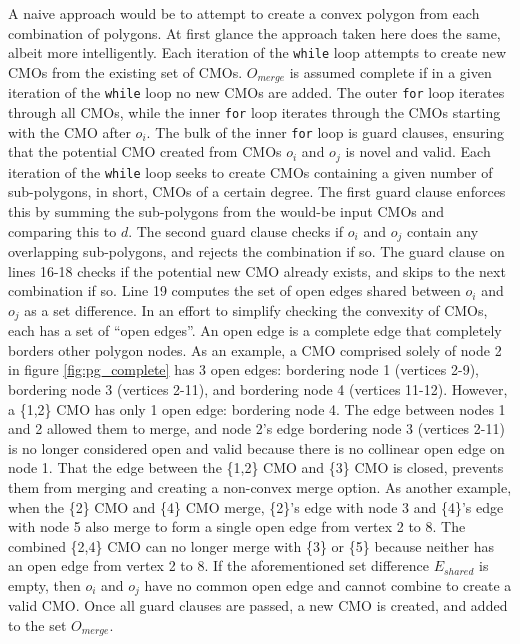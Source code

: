 A naive approach would be to attempt to create a convex polygon from each combination of polygons.
At first glance the approach taken here does the same, albeit more intelligently.
Each iteration of the \verb|while| loop attempts to create new CMOs from the existing set of CMOs.
$O_{merge}$ is assumed complete if in a given iteration of the \verb|while| loop no new CMOs are added.
The outer \verb|for| loop iterates through all CMOs, while the inner \verb|for| loop iterates through the CMOs starting with the CMO after $o_i$.
The bulk of the inner \verb|for| loop is guard clauses, ensuring that the potential CMO created from CMOs $o_i$ and $o_j$ is novel and valid.
Each iteration of the \verb|while| loop seeks to create CMOs containing a given number of sub-polygons, in short, CMOs of a certain degree.
The first guard clause enforces this by summing the sub-polygons from the would-be input CMOs and comparing this to $d$.
The second guard clause checks if $o_i$ and $o_j$ contain any overlapping sub-polygons, and rejects the combination if so.
The guard clause on lines 16-18 checks if the potential new CMO already exists, and skips to the next combination if so.
Line 19 computes the set of open edges shared between $o_i$ and $o_j$ as a set difference.
In an effort to simplify checking the convexity of CMOs, each has a set of ``open edges''.
An open edge is a complete edge that completely borders other polygon nodes.
As an example, a CMO comprised solely of node 2 in figure \ref{fig:pg_complete} has 3 open edges: bordering node 1 (vertices 2-9), bordering node 3 (vertices 2-11), and bordering node 4 (vertices 11-12).
However, a \{1,2\} CMO has only 1 open edge: bordering node 4.
The edge between nodes 1 and 2 allowed them to merge, and node 2's edge bordering node 3 (vertices 2-11) is no longer considered open and valid because there is no collinear open edge on node 1.
That the edge between the \{1,2\} CMO and \{3\} CMO is closed, prevents them from merging and creating a non-convex merge option.
As another example, when the \{2\} CMO and \{4\} CMO merge, \{2\}'s edge with node 3 and \{4\}'s edge with node 5 also merge to form a single open edge from vertex 2 to 8.
The combined \{2,4\} CMO can no longer merge with \{3\} or \{5\} because neither has an open edge from vertex 2 to 8.
If the aforementioned set difference $E_{shared}$ is empty, then $o_i$ and $o_j$ have no common open edge and cannot combine to create a valid CMO.
Once all guard clauses are passed, a new CMO is created, and added to the set $O_{merge}$.

